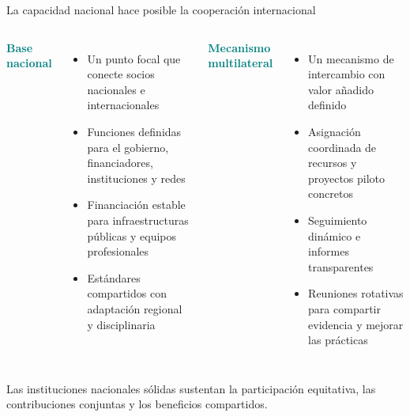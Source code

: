 \documentclass[aspectratio=169,11pt]{beamer}
\newcommand{\tagline}[1]{\textcolor{Teal}{\bfseries\small#1}}
\begin{document}
\begin{frame}{La capacidad nacional hace posible la cooperación internacional}
  \begin{columns}[T,onlytextwidth]
      \tagline{Base nacional}
      \vspace{0.20cm}
      \begin{itemize}\setlength\itemsep{0.20cm}
        \item Un punto focal que conecte socios nacionales e internacionales
        \item Funciones definidas para el gobierno, financiadores, instituciones y redes
        \item Financiación estable para infraestructuras públicas y equipos profesionales
        \item Estándares compartidos con adaptación regional y disciplinaria
      \end{itemize}
      \tagline{Mecanismo multilateral}
      \vspace{0.20cm}
      \begin{itemize}\setlength\itemsep{0.20cm}
        \item Un mecanismo de intercambio con valor añadido definido
        \item Asignación coordinada de recursos y proyectos piloto concretos
        \item Seguimiento dinámico e informes transparentes
        \item Reuniones rotativas para compartir evidencia y mejorar las prácticas
      \end{itemize}
  \end{columns}
  \vfill
  \begin{center}\colorbox{Mist}{\parbox{.9\linewidth}{\centering\small Las instituciones nacionales sólidas sustentan la participación equitativa, las contribuciones conjuntas y los beneficios compartidos.}}\end{center}
\end{frame}
\end{document}
